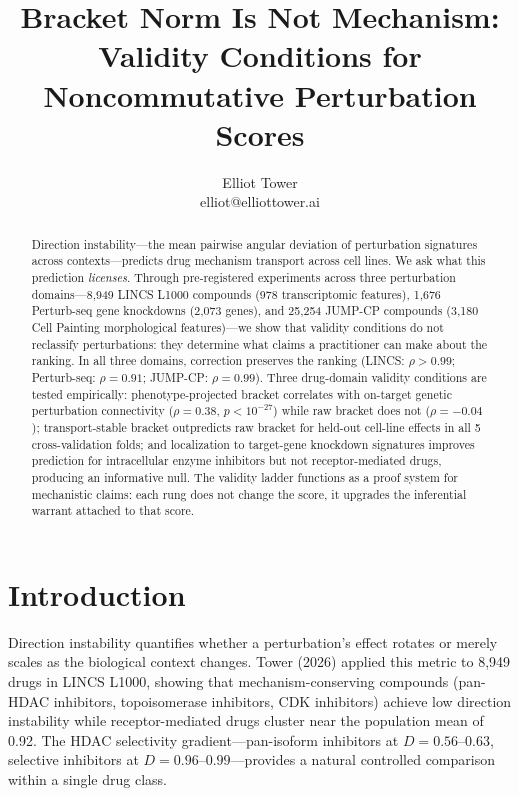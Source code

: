 \documentclass{article}
\title{Bracket Norm Is Not Mechanism:\\ Validity Conditions for Noncommutative Perturbation Scores}
\author{\name Elliot Tower \\
      \email elliot@elliottower.ai}
\begin{document}
\maketitle

\begin{abstract}
Direction instability---the mean pairwise angular deviation of perturbation
signatures across contexts---predicts drug mechanism transport across cell
lines. We ask what this prediction \emph{licenses}. Through pre-registered
experiments across three perturbation domains---8{,}949 LINCS L1000
compounds (978 transcriptomic features), 1{,}676 Perturb-seq gene
knockdowns \citep{replogle2022mapping} (2{,}073 genes), and 25{,}254
JUMP-CP compounds (3{,}180 Cell Painting morphological features)---we show
that validity conditions do not reclassify perturbations: they determine
what claims a practitioner can make about the ranking. In all three domains,
correction preserves the ranking (LINCS: $\rho > 0.99$; Perturb-seq: $\rho
= 0.91$; JUMP-CP: $\rho = 0.99$). Three drug-domain validity conditions
are tested empirically: phenotype-projected bracket correlates with
on-target genetic perturbation connectivity ($\rho = 0.38$, $p < 10^{-27}$)
while raw bracket does not ($\rho = -0.04$); transport-stable bracket
outpredicts raw bracket for held-out cell-line effects in all 5
cross-validation folds; and localization to target-gene knockdown signatures
improves prediction for intracellular enzyme inhibitors but not
receptor-mediated drugs, producing an informative null. The validity
ladder functions as a proof system for mechanistic claims: each rung does not
change the score, it upgrades the inferential warrant attached to that score.
\end{abstract}

\section{Introduction}

Direction instability quantifies whether a perturbation's effect rotates or
merely scales as the biological context changes. Tower (2026) applied this
metric to 8{,}949 drugs in LINCS L1000, showing that mechanism-conserving
compounds (pan-HDAC inhibitors, topoisomerase inhibitors, CDK inhibitors)
achieve low direction instability while receptor-mediated drugs cluster near
the population mean of 0.92. The HDAC selectivity gradient---pan-isoform
inhibitors at $D = 0.56$--$0.63$, selective inhibitors at $D = 0.96$--$0.99$---provides
a natural controlled comparison within a single drug class.
\end{document}
